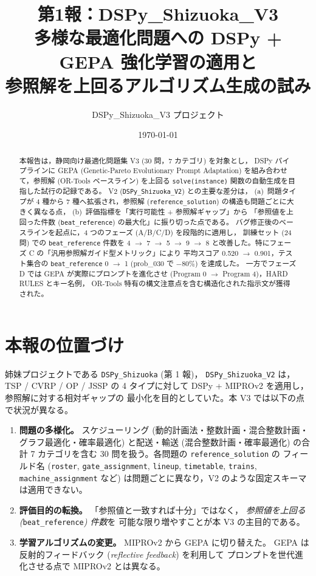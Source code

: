 \documentclass[uplatex,dvipdfmx,a4paper,11pt]{jsarticle}
\title{第1報：DSPy\_Shizuoka\_V3\\
多様な最適化問題への
DSPy + GEPA 強化学習の適用と\\
参照解を上回るアルゴリズム生成の試み}
\author{DSPy\_Shizuoka\_V3 プロジェクト}
\date{\today}
\begin{document}
\maketitle

\begin{abstract}
本報告は，静岡向け最適化問題集 V3 (30 問，7 カテゴリ) を対象とし，
DSPy パイプラインに GEPA (Genetic-Pareto Evolutionary Prompt Adaptation)
を組み合わせて，参照解 (OR-Tools ベースライン) を上回る
\texttt{solve(instance)} 関数の自動生成を目指した試行の記録である。
V2 (\texttt{DSPy\_Shizuoka\_V2}) との主要な差分は，
(a)~問題タイプが 4 種から 7 種へ拡張され，参照解 (\texttt{reference\_solution})
の構造も問題ごとに大きく異なる点，
(b)~評価指標を「実行可能性 + 参照解ギャップ」から
「参照値を上回った件数 (\texttt{beat\_reference}) の最大化」に振り切った点である。
バグ修正後のベースラインを起点に，4 つのフェーズ (A/B/C/D) を段階的に適用し，
訓練セット (24 問) での \texttt{beat\_reference} 件数を
4 $\rightarrow$ 7 $\rightarrow$ 5 $\rightarrow$ 9 $\rightarrow$ 8
と改善した。特にフェーズ C の「汎用参照解ガイド型メトリック」により
平均スコア 0.520 $\rightarrow$ 0.901，テスト集合の \texttt{beat\_reference}
0 $\rightarrow$ 1 (prob\_030 で $-80\%$) を達成した。
一方でフェーズ D では GEPA が実際にプロンプトを進化させ
(Program 0 $\rightarrow$ Program 4)，HARD RULES とキー名例，
OR-Tools 特有の構文注意点を含む構造化された指示文が獲得された。
\end{abstract}

\tableofcontents

\section{本報の位置づけ}\label{sec:pos}

姉妹プロジェクトである \texttt{DSPy\_Shizuoka} (第 1 報)，
\texttt{DSPy\_Shizuoka\_V2} は，
TSP / CVRP / OP / JSSP の 4 タイプに対して
DSPy + MIPROv2 を適用し，参照解に対する相対ギャップの
最小化を目的としていた。本 V3 では以下の点で状況が異なる。

\begin{enumerate}
  \item \textbf{問題の多様化。}
    スケジューリング (動的計画法・整数計画・混合整数計画・グラフ最適化・確率最適化)
    と配送・輸送 (混合整数計画・確率最適化) の合計 7 カテゴリを含む
    30 問を扱う。各問題の \texttt{reference\_solution} の
    フィールド名 (\texttt{roster}, \texttt{gate\_assignment}, \texttt{lineup},
    \texttt{timetable}, \texttt{trains}, \texttt{machine\_assignment} など)
    は問題ごとに異なり，V2 のような固定スキーマは適用できない。
  \item \textbf{評価目的の転換。}
    「参照値と一致すれば十分」ではなく，
    \emph{参照値を上回る (}\texttt{beat\_reference}\emph{) 件数}を
    可能な限り増やすことが本 V3 の主目的である。
  \item \textbf{学習アルゴリズムの変更。}
    MIPROv2 から GEPA \cite{gepa} に切り替えた。
    GEPA は反射的フィードバック (\emph{reflective feedback}) を利用して
    プロンプトを世代進化させる点で MIPROv2 とは異なる。
\end{enumerate}
\end{document}
